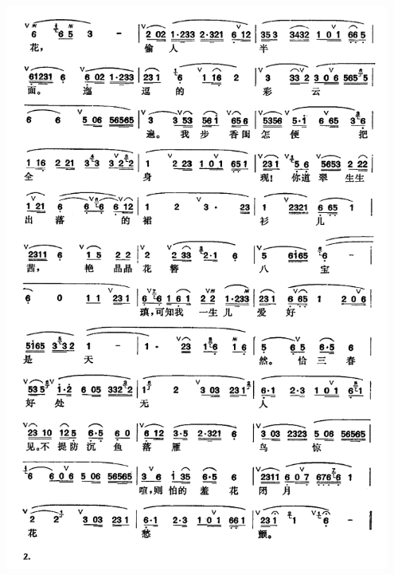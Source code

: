 \documentclass[cn,pad,twocol]{elegantbook}
\begin{document}
\paragraph*{\includegraphics[width=0.95\textwidth]{mudanting/2020-牡丹亭-游园惊梦2}} 
\end{document}
